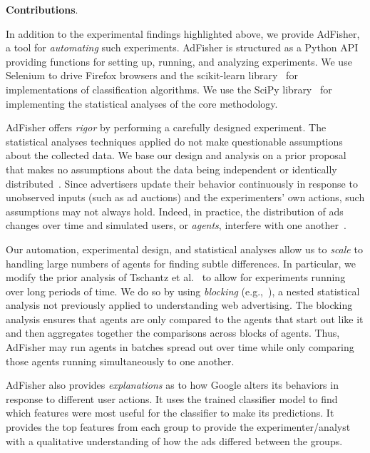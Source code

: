 \documentclass{article}
\makeatletter
\newcommand\gobblepars{\@ifnextchar\par {\expandafter\gobblepars\@gobble}{}}
\renewcommand{\paragraph}[1]{\smallskip\noindent\textbf{#1}.\ \ \gobblepars}
\makeatother
\begin{document}
\paragraph{Contributions}
In addition to the experimental findings highlighted above, we provide AdFisher, a tool for \emph{automating} such experiments.  AdFisher is structured as a Python API providing functions for setting up, running, and analyzing experiments.
We use Selenium to drive Firefox browsers and the scikit-learn library~\cite{scikit-learn} for implementations of classification algorithms. 
We use the SciPy library~\cite{scipy} for implementing the statistical analyses of the core methodology.




AdFisher offers \emph{rigor} by performing a carefully designed experiment. The statistical analyses techniques applied do not make questionable assumptions about the collected data. We base our design and analysis on a prior proposal that makes no assumptions about the data being independent or identically distributed~\cite{tschantz14arxiv}. Since advertisers update their behavior continuously in response to unobserved inputs (such as ad auctions) and the experimenters' own actions, such assumptions may not always hold. Indeed, in practice, the distribution of ads changes over time and simulated users, or \emph{agents}, interfere with one another~\cite{tschantz14arxiv}.

Our automation, experimental design, and statistical analyses allow us to \emph{scale} to handling large numbers of agents for finding subtle differences.  In particular, we modify the prior analysis of Tschantz et al.~\cite{tschantz14arxiv} to allow for experiments running over long periods of time.  We do so by using \emph{blocking} (e.g.,~\cite{good05book}), a nested statistical analysis not previously applied to understanding web advertising.  The blocking analysis ensures that agents are only compared to the agents that start out like it and then aggregates together the comparisons across blocks of agents.  Thus, AdFisher may run agents in batches spread out over time while only comparing those agents running simultaneously to one another.

AdFisher also provides \emph{explanations} as to how Google alters its behaviors in response to different user actions. 
It uses the trained classifier model to find which features were most useful for the classifier to make its predictions. It provides the top features from each group to provide the experimenter/analyst with a qualitative understanding of how the ads differed between the groups. 
\end{document}
